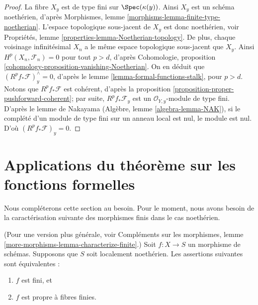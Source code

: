 \begin{proof}
La fibre $X_y$ est de type fini sur $\Spec(\kappa(y))$.
Ainsi $X_y$ est un schéma noethérien, d'après
Morphismes, lemme \ref{morphisms-lemma-finite-type-noetherian}.
L'espace topologique sous-jacent de $X_y$ est donc noethérien, voir
Propriétés, lemme \ref{properties-lemma-Noetherian-topology}.
De plus, chaque voisinage
infinitésimal $X_n$ a le même espace topologique sous-jacent que $X_y$.
Ainsi $H^p(X_n, \mathcal{F}_n) = 0$ pour tout $p > d$,
d'après Cohomologie, proposition \ref{cohomology-proposition-vanishing-Noetherian}.
On en déduit que $(R^pf_*\mathcal{F})_y^\wedge = 0$,
d'après le lemme \ref{lemma-formal-functions-stalk}, pour $p > d$.
Notons que $R^pf_*\mathcal{F}$ est cohérent, d'après la
proposition \ref{proposition-proper-pushforward-coherent}; par
suite, $R^pf_*\mathcal{F}_y$ est un
$\mathcal{O}_{Y, y}$-module de type fini. D'après le lemme
de Nakayama (Algèbre, lemme \ref{algebra-lemma-NAK}),
si le complété d'un module de type fini sur un anneau
local est nul, le module est nul. D'où
$(R^pf_*\mathcal{F})_y = 0$.
\end{proof}








\section{Applications du théorème sur les fonctions formelles}
\label{section-applications-formal-functions}


\noindent
Nous compléterons cette section au besoin. Pour le moment, nous avons besoin de la
caractérisation suivante des morphismes finis dans le cas noethérien.

\begin{lemma}
\label{lemma-characterize-finite}
(Pour une version plus générale, voir Compléments
sur les morphismes, lemme \ref{more-morphisms-lemma-characterize-finite}.)
Soit $f : X \to S$ un morphisme de schémas. Supposons
que $S$ soit localement noethérien. Les
assertions suivantes sont équivalentes :
\begin{enumerate}
\item $f$ est fini, et
\item $f$ est propre à fibres finies.
\end{enumerate}
\end{lemma}

